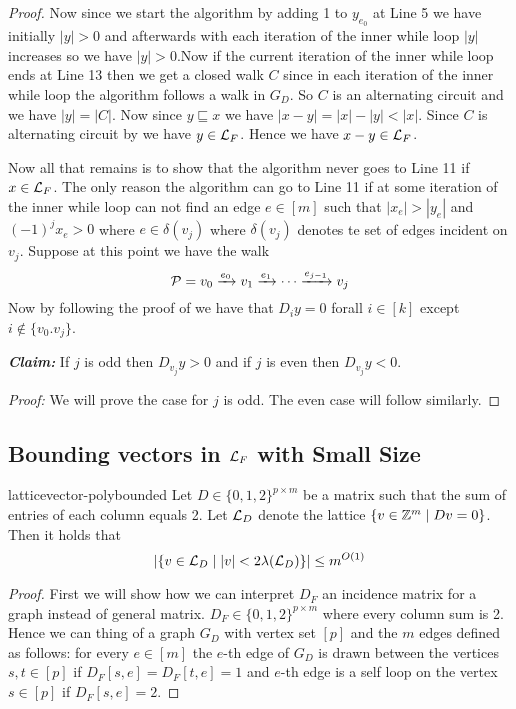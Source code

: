 \begin{proof}
Now since we start the algorithm by adding 1 to $y_{e_0}$ at Line 5 we have initially $|y|>0$ and afterwards with each iteration of the inner while loop $|y|$ increases so we have $|y|>0$.Now if the current iteration of the inner while loop ends at Line 13 then we get a closed walk $C$ since in each iteration of the inner while loop the algorithm follows a walk in $G_D$. So $C$ is an alternating circuit and  we have $|y|=|C|$. Now since $y\sqsubseteq x$ we have $|x-y|=|x|-|y|<|x|$. Since $C$ is alternating circuit by  we have $y\in \mathcal{L}_F$. Hence we have $x-y\in\mathcal{L}_F$.

Now all that remains is to show that the algorithm never goes to Line 11 if $x\in\mathcal{L}_F$. The only reason the algorithm can go to Line 11 if at some iteration of the inner while loop can not find an edge $e\in [m]$ such that $|x_e|>|y_e|$ and $(-1)^jx_e>0$ where $e\in \delta(v_j)$ where $\delta(v_j)$ denotes te set of edges incident on $v_j$. Suppose at this point we have the walk $$\mathcal{P}=v_0\xrightarrow{e_0}v_1\xrightarrow{e_1}\cdots \xrightarrow{e_{j-1}}v_j$$Now by following the proof of  we have that $D_iy=0$ forall $i\in[k]$ except $i\notin \{v_0.v_j\}$.\parinf

\textbf{\textit{Claim:}} If $j$ is odd then $D_{v_j}y>0$ and if $j$ is even then $D_{v_j}y<0$.

\textit{Proof:} We will prove the case for $j$ is odd. The even case will follow similarly.

\end{proof}

\subsection{Bounding vectors in $\mathcal{L}_F$ with Small Size}
\begin{Theorem}{\cite{gurjarfrac}}{latticevector-polybounded}
	Let $D\in \{0,1,2\}^{p\times m}$ be a matrix such that the sum of entries of each column equals 2. Let $\mathcal{L}_D$ denote the lattice $\{v\in\mathbb{Z}^m\mid Dv=0\}$. Then it holds that $$|\{v\in \mathcal{L}_D\mid |v|<2\lambda(\mathcal{L}_D)\}|\leq m^{O(1)}$$
\end{Theorem}
\begin{proof}
	First we will show how we can interpret $D_F$ an incidence matrix for a graph instead of general matrix. $D_F\in \{0,1,2\}^{p\times m}$ where every column sum is 2. Hence we can thing of a graph $G_D$ with vertex set $[p]$ and the $m$ edges defined as follows: for every $e\in [m]$ the $e$-th edge of $G_D$ is drawn between the vertices $s,t\in[p]$ if $D_F[s,e]=D_F[t,e]=1$ and $e$-th edge is a self loop on the vertex $s\in[p]$ if $D_F[s,e]=2$. 
\end{proof}

